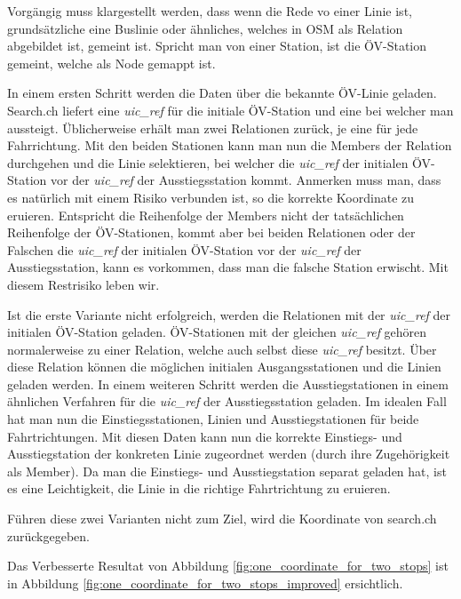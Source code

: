 Vorgängig muss klargestellt werden, dass wenn die Rede vo einer Linie ist, grundsätzliche eine Buslinie oder ähnliches, welches in \ac{OSM} als Relation \cite{osm_wiki_relation} abgebildet ist, gemeint ist. Spricht man von einer Station, ist die ÖV-Station gemeint, welche als Node gemappt ist.

In einem ersten Schritt werden die Daten über die bekannte ÖV-Linie geladen. Search.ch \cite{search_ch_route_api} liefert eine \emph{uic\_ref} für die initiale ÖV-Station und eine bei welcher man aussteigt. Üblicherweise erhält man zwei Relationen zurück, je eine für jede Fahrrichtung. Mit den beiden Stationen kann man nun die Members der Relation durchgehen und die Linie selektieren, bei welcher die \emph{uic\_ref} der initialen ÖV-Station vor der \emph{uic\_ref} der Ausstiegsstation kommt.
Anmerken muss man, dass es natürlich mit einem Risiko verbunden ist, so die korrekte Koordinate zu eruieren. Entspricht die Reihenfolge der Members nicht der tatsächlichen Reihenfolge der ÖV-Stationen, kommt aber bei beiden Relationen oder der Falschen die \emph{uic\_ref} der initialen ÖV-Station vor der \emph{uic\_ref} der Ausstiegsstation, kann es vorkommen, dass man die falsche Station erwischt. Mit diesem Restrisiko leben wir.

Ist die erste Variante nicht erfolgreich, werden die Relationen mit der \emph{uic\_ref} der initialen ÖV-Station geladen. ÖV-Stationen mit der gleichen \emph{uic\_ref} gehören normalerweise zu einer Relation, welche auch selbst diese \emph{uic\_ref} besitzt. Über diese Relation können die möglichen initialen Ausgangsstationen und die Linien geladen werden. In einem weiteren Schritt werden die Ausstiegstationen in einem ähnlichen Verfahren für die \emph{uic\_ref} der Ausstiegsstation geladen. Im idealen Fall hat man nun die Einstiegsstationen, Linien und Ausstiegstationen für beide Fahrtrichtungen. Mit diesen Daten kann nun die korrekte Einstiegs- und Ausstiegstation der konkreten Linie zugeordnet werden (durch ihre Zugehörigkeit als Member). Da man die Einstiegs- und Ausstiegstation separat geladen hat, ist es eine Leichtigkeit, die Linie in die richtige Fahrtrichtung zu eruieren.

Führen diese zwei Varianten nicht zum Ziel, wird die Koordinate von search.ch zurückgegeben.

Das Verbesserte Resultat von Abbildung \ref{fig:one_coordinate_for_two_stops} ist in Abbildung \ref{fig:one_coordinate_for_two_stops_improved} ersichtlich.

